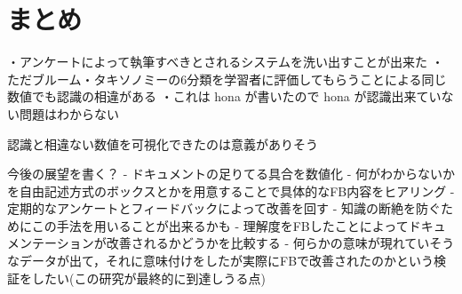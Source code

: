 \section{まとめ}


・アンケートによって執筆すべきとされるシステムを洗い出すことが出来た
・ただブルーム・タキソノミーの6分類を学習者に評価してもらうことによる同じ数値でも認識の相違がある
・これは hona が書いたので hona が認識出来ていない問題はわからない


認識と相違ない数値を可視化できたのは意義がありそう


今後の展望を書く？
- ドキュメントの足りてる具合を数値化
- 何がわからないかを自由記述方式のボックスとかを用意することで具体的なFB内容をヒアリング
- 定期的なアンケートとフィードバックによって改善を回す
- 知識の断絶を防ぐためにこの手法を用いることが出来るかも
- 理解度をFBしたことによってドキュメンテーションが改善されるかどうかを比較する
- 何らかの意味が現れていそうなデータが出て，それに意味付けをしたが実際にFBで改善されたのかという検証をしたい(この研究が最終的に到達しうる点)
